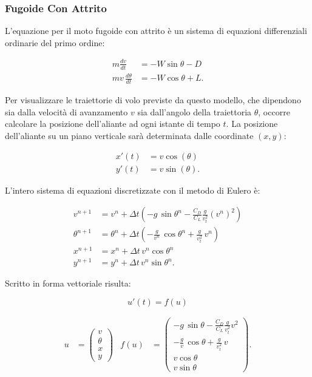 \subsubsection*{Fugoide Con Attrito}
L’equazione per il moto fugoide con attrito è un sistema di equazioni differenziali ordinarie del primo ordine: 

\begin{align}
m \frac{dv}{dt} & = - W \sin\theta - D \\
m v \, \frac{d\theta}{dt} & = - W \cos\theta + L.
\end{align}

\noindent
Per visualizzare le traiettorie di volo previste da questo modello, che dipendono sia dalla velocità di avanzamento $v$ sia dall’angolo della traiettoria $\theta$, occorre calcolare la posizione dell'aliante ad ogni istante di tempo $t$. La posizione dell’aliante su un piano verticale sarà determinata dalle coordinate $(x,y)$: 

\begin{align}
x'(t) & = v \cos(\theta) \\
y'(t) & = v \sin(\theta).
\end{align}

\noindent
L’intero sistema di equazioni discretizzate con il metodo di Eulero è:

\begin{align}
v^{n+1} & = v^n + \Delta t \left(- g\, \sin\theta^n - \frac{C_D}{C_L} \frac{g}{v_t^2} (v^n)^2 \right) \\
\theta^{n+1} & = \theta^n + \Delta t \left(- \frac{g}{v^n}\,\cos\theta^n + \frac{g}{v_t^2}\, v^n \right) \\
x^{n+1} & = x^n + \Delta t \, v^n \cos\theta^n \\
y^{n+1} & = y^n + \Delta t \, v^n \sin\theta^n.
\end{align}

\noindent
Scritto in forma vettoriale risulta: 

$$u'(t) = f(u)$$

\begin{align}
u & = \begin{pmatrix} v \\ \theta \\ x \\ y \end{pmatrix} & f(u) & = \begin{pmatrix} - g\, \sin\theta - \frac{C_D}{C_L} \frac{g}{v_t^2} v^2 \\ - \frac{g}{v}\,\cos\theta + \frac{g}{v_t^2}\, v \\ v\cos\theta \\ v\sin\theta \end{pmatrix}.
\end{align}

